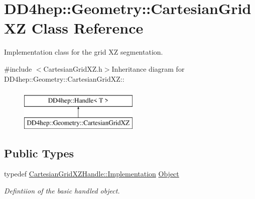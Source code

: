 \hypertarget{class_d_d4hep_1_1_geometry_1_1_cartesian_grid_x_z}{
\section{DD4hep::Geometry::CartesianGridXZ Class Reference}
\label{class_d_d4hep_1_1_geometry_1_1_cartesian_grid_x_z}
}


Implementation class for the grid XZ segmentation.  


{\ttfamily \#include $<$CartesianGridXZ.h$>$}Inheritance diagram for DD4hep::Geometry::CartesianGridXZ::\begin{figure}[H]
\begin{center}
\leavevmode
\includegraphics[height=2cm]{class_d_d4hep_1_1_geometry_1_1_cartesian_grid_x_z}
\end{center}
\end{figure}
\subsection*{Public Types}
\begin{DoxyCompactItemize}
\item 
typedef \hyperlink{class_t}{CartesianGridXZHandle::Implementation} \hyperlink{class_d_d4hep_1_1_geometry_1_1_cartesian_grid_x_z_aba1e511c43a8b46f2524a1253c660f10}{Object}
\begin{DoxyCompactList}\small\item\em Defintiion of the basic handled object. \item\end{DoxyCompactList}\end{DoxyCompactItemize}
